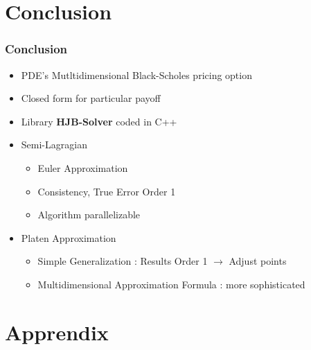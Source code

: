 \documentclass[]{beamer}
\begin{document}
\section{Conclusion}
\begin{frame}
\frametitle{Conclusion}
 \begin{itemize}
  \item PDE's Mutltidimensional Black-Scholes pricing option
  \item Closed form for particular payoff
  \item Library \textbf{HJB-Solver} coded in C++
  \item Semi-Lagragian 
  \begin{itemize}
   \item Euler Approximation
   \item Consistency, True Error Order 1
   \item Algorithm parallelizable
  \end{itemize}
\item Platen Approximation 
\begin{itemize}
 \item Simple Generalization : Results Order 1 $\longrightarrow$ Adjust points
 \item Multidimensional Approximation Formula  : more sophisticated
\end{itemize}

 \end{itemize}

\end{frame}
\section*{Apprendix}
\end{document}
